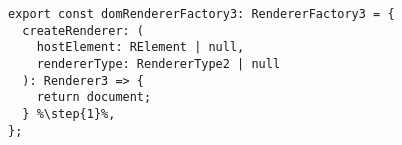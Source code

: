 \begin{verbatim}
export const domRendererFactory3: RendererFactory3 = {
  createRenderer: (
    hostElement: RElement | null,
    rendererType: RendererType2 | null
  ): Renderer3 => {
    return document;
  } %\step{1}%,
};
\end{verbatim}
